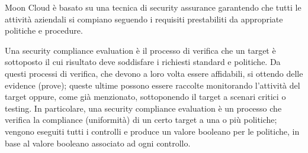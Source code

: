 Moon Cloud è basato su una tecnica di security assurance garantendo che tutti le attività aziendali si compiano
seguendo i requisiti prestabiliti da appropriate politiche e procedure.

Una security compliance evaluation è il processo di verifica che un target è sottoposto il cui risultato deve 
soddisfare i richiesti standard e politiche. Da questi processi di verifica, che devono a loro volta essere 
affidabili, si ottendo delle evidence (prove); queste ultime possono essere raccolte monitorando l'attività
del target oppure, come già menzionato, sottoponendo il target a scenari
critici o testing.
In particolare, una security compliance evaluation è un processo che verifica la compliance (uniformità)
di un certo target a una o più politiche; vengono eseguiti tutti i controlli e produce un valore booleano per
le politiche, in base al valore booleano associato ad ogni controllo.